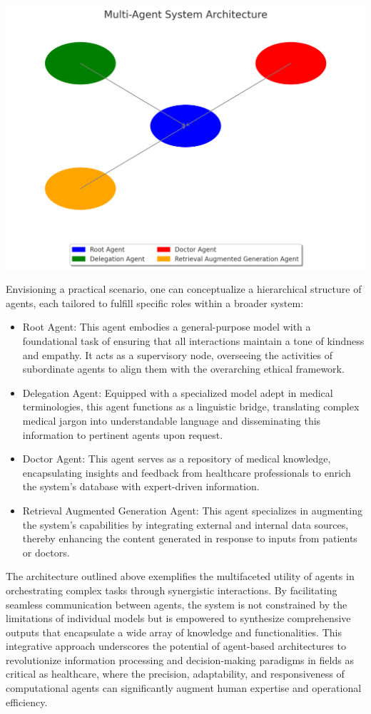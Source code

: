 \documentclass{article}
\begin{document}
\includegraphics[scale=0.5]{60e98697-1ed7-43f9-aacd-6eb0d014d1ea.png}

Envisioning a practical scenario, one can conceptualize a hierarchical structure of agents, each tailored to fulfill specific roles within a broader system:

\begin{itemize}
	\item Root Agent: This agent embodies a general-purpose model with a foundational task of ensuring that all interactions maintain a tone of kindness and empathy. It acts as a supervisory node, overseeing the activities of subordinate agents to align them with the overarching ethical framework.
	\item Delegation Agent: Equipped with a specialized model adept in medical terminologies, this agent functions as a linguistic bridge, translating complex medical jargon into understandable language and disseminating this information to pertinent agents upon request.
	\item Doctor Agent: This agent serves as a repository of medical knowledge, encapsulating insights and feedback from healthcare professionals to enrich the system's database with expert-driven information.
	\item Retrieval Augmented Generation Agent: This agent specializes in augmenting the system's capabilities by integrating external and internal data sources, thereby enhancing the content generated in response to inputs from patients or doctors.

\end{itemize}

The architecture outlined above exemplifies the multifaceted utility of agents in orchestrating complex tasks through synergistic interactions. By facilitating seamless communication between agents, the system is not constrained by the limitations of individual models but is empowered to synthesize comprehensive outputs that encapsulate a wide array of knowledge and functionalities. This integrative approach underscores the potential of agent-based architectures to revolutionize information processing and decision-making paradigms in fields as critical as healthcare, where the precision, adaptability, and responsiveness of computational agents can significantly augment human expertise and operational efficiency.
\end{document}
